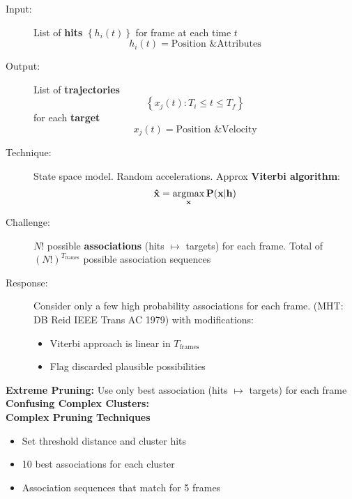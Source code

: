 \documentclass[12pt]{article}
\newcommand{\argmax}{\operatorname*{argmax}}
\begin{document}
\pagestyle{empty}
\huge {}
\LARGE
\begin{description}
\item[Input:] List of \textbf{hits} $\left\{ h_i(t) \right\}$ for
  frame at each time $t$
  \begin{equation*}
    h_i(t) = \text{Position \& Attributes}
  \end{equation*}
\item[Output:] List of \textbf{trajectories}
  \begin{equation*}
    \left\{ x_j(t): T_i
    \leq t \leq T_f \right\}
  \end{equation*}
  for each \textbf{target}
  \begin{equation*}
    x_j(t) = \text{Position \& Velocity}
  \end{equation*}
\item[Technique:] State space model.  Random accelerations.  Approx
  \textbf{Viterbi algorithm}:
  \begin{equation*}
    \bf{\hat x} = \argmax_{\bf{x}} P(\bf{x}|\bf{h})
  \end{equation*}
\end{description}
\newpage
\begin{description}
\item[Challenge:] $N!$ possible \textbf{associations} (hits $\mapsto$
  targets) for each frame.  Total of $(N!)^{T_{\text{frames}}}$
  possible association sequences
\item[Response:] Consider only a few high probability associations for
  each frame.  (MHT: DB Reid IEEE Trans AC 1979) with modifications:
  \begin{itemize}
  \item Viterbi approach is linear in ${T_{\text{frames}}}$
  \item Flag discarded plausible possibilities
  \end{itemize}
\end{description}
\newpage
{\bf Extreme Pruning:}
Use only best association (hits $\mapsto$ targets) for each frame
\vspace{1cm}\\ 
\newpage
{\bf Confusing Complex Clusters:}
\vspace{1cm}\\ 
\newpage
{\bf Complex Pruning Techniques}
\begin{itemize}
\item Set threshold distance and cluster hits
\item 10 best associations for each cluster
\item Association sequences that match for 5 frames
\end{itemize}
\end{document}
